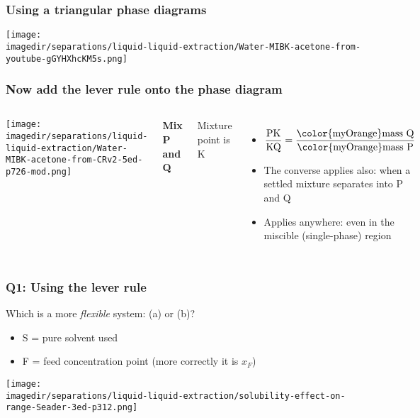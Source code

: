 \begin{frame}\frametitle{Using a triangular phase diagrams}
	\begin{center}
		\texttt{[image: \\imagedir/separations/liquid-liquid-extraction/Water-MIBK-acetone-from-youtube-gGYHXhcKM5s.png]}
	\end{center}
	\vspace{-12pt}
\end{frame}

\begin{frame}\frametitle{Now add the lever rule onto the phase diagram}
	\begin{columns}[t]
			\begin{center}
				\texttt{[image: \\imagedir/separations/liquid-liquid-extraction/Water-MIBK-acetone-from-CRv2-5ed-p726-mod.png]}
			\end{center}
			\textbf{Mix P and Q}

			\vspace{6pt}
			Mixture point is K
			\begin{itemize}
				\item	$\displaystyle \frac{\text{PK}}{\text{KQ}} = \displaystyle\frac{\text{{\color{myOrange}mass} Q}}{\text{{\color{myOrange}mass} P}}$
				\vspace{8pt}
				\item	The converse applies also: when a settled mixture separates into P and Q
				\item	Applies anywhere: even in the miscible (single-phase) region
			\end{itemize}
	\end{columns}
\end{frame}

\begin{frame}\frametitle{Q1: Using the lever rule}
	Which is a more \emph{flexible} system: (a) or (b)?
	\begin{itemize}
		\item	S = pure solvent used
		\item	F = feed concentration point (more correctly it is $x_F$)
	\end{itemize}

	\begin{center}
		\texttt{[image: \\imagedir/separations/liquid-liquid-extraction/solubility-effect-on-range-Seader-3ed-p312.png]}
	\end{center}

	\iftoggle{student}{
		Answer: \pause range of feed concentrations ($x_F$) is wider, i.e. more desirable, for \textbf{(a)}. Difference between (a) and (b):
		\begin{itemize}
			\item	due to solvent choice
			\item	due to different temperatures
			\item	due to pH modification, \emph{etc}
		\end{itemize}
	}{Answer: }
\end{frame}

